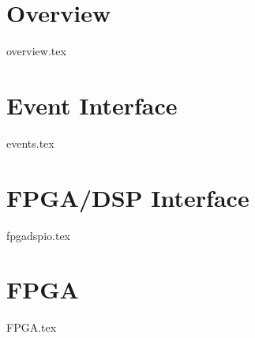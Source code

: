 \documentclass{book}
\begin{document}
\chapter{Overview}

{overview.tex}

\chapter{Event Interface}

{events.tex}

\chapter{FPGA/DSP Interface}

{fpgadspio.tex}

\chapter{FPGA}

{FPGA.tex}
\end{document}
